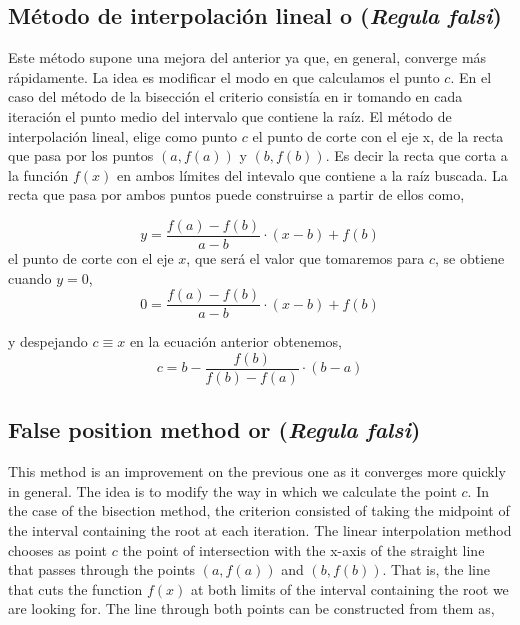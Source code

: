 \begin{paracol}{2}
\switchcolumn


\subsection{Método de interpolación lineal o (\emph{Regula falsi})}
Este método supone una mejora del anterior ya que, en general,  converge más rápidamente. La idea es modificar el modo en que calculamos el punto $c$. En el caso del método de la bisección el criterio consistía en ir tomando en cada iteración el punto medio del intervalo que contiene la raíz. El método de interpolación lineal, elige como punto $c$ el punto de corte con el eje x, de la recta que pasa por los puntos $\left(a,f(a)\right)$ y $\left(b,f(b)\right)$. Es decir la recta que corta a la función $f(x)$ en ambos límites del intevalo que contiene a la raíz buscada. La recta que pasa por ambos puntos puede construirse a partir de ellos como,

\begin{equation*}
y=\frac{f(a)-f(b)}{a-b}\cdot(x-b)+f(b)
\end{equation*}
el punto de corte con el eje $x$, que será el valor que tomaremos para $c$, se obtiene cuando $y=0$,
\begin{equation*}
0=\frac{f(a)-f(b)}{a-b}\cdot(x-b)+f(b)
\end{equation*}

y despejando $c\equiv x$ en la ecuación anterior obtenemos,
\begin{equation*}
c=b-\frac{f(b)}{f(b)-f(a)}\cdot(b-a)
\end{equation*}

\switchcolumn

\subsection{False position method or (\emph{Regula falsi})}

This method is an improvement on the previous one as it converges more quickly in general. The idea is to modify the way in which we calculate the point $c$. In the case of the bisection method, the criterion consisted of taking the midpoint of the interval containing the root at each iteration. The linear interpolation method chooses as point $c$ the point of intersection with the x-axis of the straight line that passes through the points $\left(a,f(a)\right)$ and $\left(b,f(b)\right)$. That is, the line that cuts the function $f(x)$ at both limits of the interval containing the root we are looking for. The line through both points can be constructed from them as,


\end{paracol}
